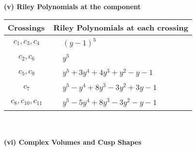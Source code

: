 \documentclass[1p]{elsarticle_modified}
\theoremstyle{definition}
\begin{document}
\newpage\renewcommand{\arraystretch}{1}
\flushleft \textbf{(v) Riley Polynomials at the component}\newline \\
\begin{tabular}{m{50pt}|m{274pt}}
Crossings & \hspace{64pt}Riley Polynomials at each crossing \\
\hline $$\begin{aligned}c_{1},c_{3},c_{4}\end{aligned}$$&$\begin{aligned}
&(y-1)^5
\end{aligned}$\\
\hline $$\begin{aligned}c_{2},c_{6}\end{aligned}$$&$\begin{aligned}
&y^5
\end{aligned}$\\
\hline $$\begin{aligned}c_{5},c_{9}\end{aligned}$$&$\begin{aligned}
&y^5+3 y^4+4 y^3+y^2- y-1
\end{aligned}$\\
\hline $$\begin{aligned}c_{7}\end{aligned}$$&$\begin{aligned}
&y^5- y^4+8 y^3-3 y^2+3 y-1
\end{aligned}$\\
\hline $$\begin{aligned}c_{8},c_{10},c_{11}\end{aligned}$$&$\begin{aligned}
&y^5-5 y^4+8 y^3-3 y^2- y-1
\end{aligned}$\\
\hline
\end{tabular}\\~\\
\newpage\flushleft \textbf{(vi) Complex Volumes and Cusp Shapes}
\end{document}
